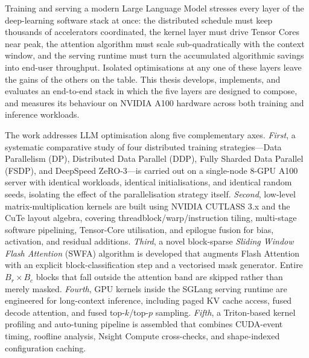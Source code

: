 Training and serving a modern Large Language Model stresses every
layer of the deep-learning software stack at once: the distributed
schedule must keep thousands of accelerators coordinated, the kernel
layer must drive Tensor Cores near peak, the attention algorithm must
scale sub-quadratically with the context window, and the serving
runtime must turn the accumulated algorithmic savings into end-user
throughput. Isolated optimisations at any one of these layers leave
the gains of the others on the table. This thesis develops, implements,
and evaluates an end-to-end stack in which the five layers are
designed to compose, and measures its behaviour on NVIDIA A100 hardware
across both training and inference workloads.

The work addresses LLM optimisation along five complementary axes.
\emph{First}, a systematic comparative study of four distributed training
strategies---Data Parallelism (DP), Distributed Data Parallel (DDP), Fully
Sharded Data Parallel (FSDP), and DeepSpeed ZeRO-3---is carried out on a
single-node 8-GPU A100 server with identical workloads, identical
initialisations, and identical random seeds, isolating the effect of the
parallelisation strategy itself. \emph{Second}, low-level matrix-multiplication
kernels are built using NVIDIA CUTLASS 3.x and the CuTe layout algebra,
covering threadblock/warp/instruction tiling, multi-stage software pipelining,
Tensor-Core utilisation, and epilogue fusion for bias, activation, and
residual additions. \emph{Third}, a novel block-sparse \emph{Sliding Window
Flash Attention} (SWFA) algorithm is developed that augments Flash Attention
with an explicit block-classification step and a vectorised mask generator.
Entire $B_r\!\times\!B_c$ blocks that fall outside the attention band are
skipped rather than merely masked. \emph{Fourth}, GPU kernels inside the
SGLang serving runtime are engineered for long-context inference, including
paged KV cache access, fused decode attention, and fused top-$k$/top-$p$
sampling. \emph{Fifth}, a Triton-based kernel profiling and auto-tuning
pipeline is assembled that combines CUDA-event timing, roofline analysis,
Nsight Compute cross-checks, and shape-indexed configuration caching.

